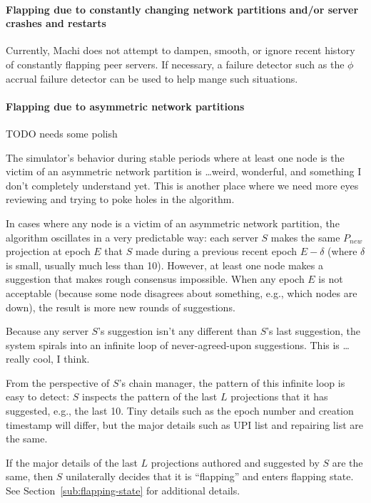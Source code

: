 \documentclass[preprint,10pt]{sigplanconf}
\begin{document}
\paragraph{Flapping due to constantly changing network partitions and/or server crashes and restarts}

Currently, Machi does not attempt to dampen, smooth, or ignore recent
history of constantly flapping peer servers.  If necessary, a failure
detector such as the $\phi$ accrual failure detector
\cite{phi-accrual-failure-detector} can be used to help mange such
situations.

\paragraph{Flapping due to asymmetric network partitions} TODO needs
some polish

The simulator's behavior during stable periods where at least one node
is the victim of an asymmetric network partition is \ldots weird,
wonderful, and something I don't completely understand yet.  This is
another place where we need more eyes reviewing and trying to poke
holes in the algorithm.

In cases where any node is a victim of an asymmetric network
partition, the algorithm oscillates in a very predictable way: each
server $S$ makes the same $P_{new}$ projection at epoch $E$ that $S$ made
during a previous recent epoch $E-\delta$ (where $\delta$ is small, usually
much less than 10).  However, at least one node makes a suggestion that
makes rough consensus impossible.  When any epoch $E$ is not
acceptable (because some node disagrees about something, e.g.,
which nodes are down),
the result is more new rounds of suggestions.

Because any server $S$'s suggestion isn't any different than $S$'s last
suggestion, the system spirals into an infinite loop of
never-agreed-upon suggestions.  This is \ldots really cool, I think.

From the perspective of $S$'s chain manager, the pattern of this
infinite loop is easy to detect: $S$ inspects the pattern of the last
$L$ projections that it has suggested, e.g., the last 10.
Tiny details such as the epoch number and creation timestamp will
differ, but the major details such as UPI list and repairing list are
the same.

If the major details of the last $L$ projections authored and
suggested by $S$ are the same, then $S$ unilaterally decides that it
is ``flapping'' and enters flapping state.  See
Section~\ref{sub:flapping-state} for additional details.
\end{document}
